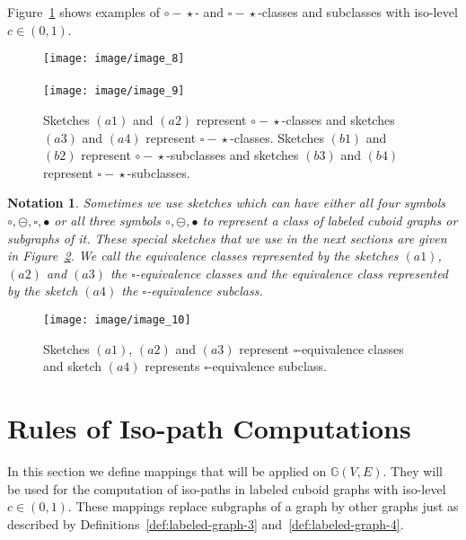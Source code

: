 \documentclass[a4paper,11pt]{article}
\newtheorem{notation}{Notation}
\begin{document}
\noindent Figure~\ref{image_8_9} shows examples of $\circ\!-\!\star$- and
$\square\!-\!\star$-classes and subclasses with iso-level $c\in (0,1)$.
\begin{figure}[!ht]
\texttt{[image: image/image\_8]}\\ \\
\texttt{[image: image/image\_9]}
\caption{Sketches $(a1)$ and $(a2)$ represent $\circ\!-\!\star$-classes and sketches $(a3)$ and $(a4)$ represent
$\square\!-\!\star$-classes. Sketches $(b1)$ and $(b2)$ represent $\circ\!-\!\star$-subclasses and
sketches $(b3)$ and $(b4)$ represent $\square\!-\!\star$-subclasses.}
\label{image_8_9}
\end{figure}
\FloatBarrier

\begin{notation}
Sometimes we use sketches which can have either all four symbols $\circ,\circleddash,\square,\bullet$ or
all three symbols $\circ,\circleddash,\bullet$ to represent a class of labeled cuboid graphs or subgraphs of it.
These special sketches that we use in the next sections are given in Figure~\ref{image_10}. We
call the equivalence classes represented by the sketches $(a1)$, $(a2)$ and $(a3)$ the $\square$-equivalence classes
and the equivalence class represented by the sketch $(a4)$ the $\square$-equivalence subclass.
\label{not:special}
\end{notation}
\begin{figure}[!ht]
\texttt{[image: image/image\_10]}
\caption{Sketches $(a1)$, $(a2)$ and $(a3)$ represent $\square$-equivalence classes and sketch
$(a4)$ represents $\square$-equivalence subclass.}
\label{image_10}
\end{figure}

\section{Rules of Iso-path Computations}
In this section we define mappings that will be applied on $\mathbb{G}(V,E)$. They
will be used for the computation of iso-paths in labeled cuboid graphs with iso-level $c\in (0,1)$.
These mappings replace subgraphs of a graph by other graphs just as described by
Definitions~\ref{def:labeled-graph-3} and~\ref{def:labeled-graph-4}.
\end{document}
